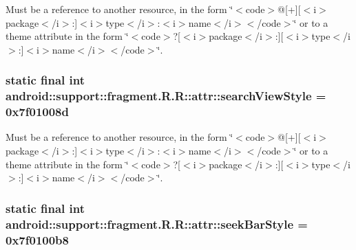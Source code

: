 Must be a reference to another resource, in the form \char`\"{}$<$code$>$@\mbox{[}+\mbox{]}\mbox{[}$<$i$>$package$<$/i$>$:\mbox{]}$<$i$>$type$<$/i$>$:$<$i$>$name$<$/i$>$$<$/code$>$\char`\"{} or to a theme attribute in the form \char`\"{}$<$code$>$?\mbox{[}$<$i$>$package$<$/i$>$:\mbox{]}\mbox{[}$<$i$>$type$<$/i$>$:\mbox{]}$<$i$>$name$<$/i$>$$<$/code$>$\char`\"{}. \hypertarget{classandroid_1_1support_1_1fragment_1_1_r_1_1attr_ed66deac2112cf9e19325af6683476aa}{
\subsubsection[{searchViewStyle}]{\setlength{\rightskip}{0pt plus 5cm}static final int android::support::fragment.R.R::attr::searchViewStyle = 0x7f01008d}}
\label{classandroid_1_1support_1_1fragment_1_1_r_1_1attr_ed66deac2112cf9e19325af6683476aa}


Must be a reference to another resource, in the form \char`\"{}$<$code$>$@\mbox{[}+\mbox{]}\mbox{[}$<$i$>$package$<$/i$>$:\mbox{]}$<$i$>$type$<$/i$>$:$<$i$>$name$<$/i$>$$<$/code$>$\char`\"{} or to a theme attribute in the form \char`\"{}$<$code$>$?\mbox{[}$<$i$>$package$<$/i$>$:\mbox{]}\mbox{[}$<$i$>$type$<$/i$>$:\mbox{]}$<$i$>$name$<$/i$>$$<$/code$>$\char`\"{}. \hypertarget{classandroid_1_1support_1_1fragment_1_1_r_1_1attr_1f7146a20f31116adb8ac239ed836dca}{
\subsubsection[{seekBarStyle}]{\setlength{\rightskip}{0pt plus 5cm}static final int android::support::fragment.R.R::attr::seekBarStyle = 0x7f0100b8}}
\label{classandroid_1_1support_1_1fragment_1_1_r_1_1attr_1f7146a20f31116adb8ac239ed836dca}


